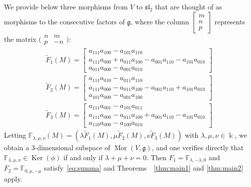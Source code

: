 \begin{ex}
We provide below three morphisms from $V$ to ${\mathfrak{sl}_2}$ that are thought of as morphisms to the consecutive 
factors of ${{\mathfrak g}}$, where the column $\left[\begin{smallmatrix} m \\ n \\ p\end{smallmatrix}\right]$ represents 
the matrix $\bigl(\begin{smallmatrix} n & m \\ p & -n \end{smallmatrix}\bigr)$:
\begin{gather*}   
  \tilde F_1(M)=
  \begin{bmatrix} a_{111}a_{100}-a_{101}a_{110} \\
  a_{111}a_{000}+a_{011}a_{100} -a_{001}a_{110}-a_{101}a_{010}\\
  a_{011}a_{000}-a_{001}a_{010} 
  \end{bmatrix}  \\
  \tilde F_2( M)=
  \begin{bmatrix} a_{111}a_{010}-a_{011}a_{110} \\
  a_{111}a_{000}-a_{011}a_{100} -a_{001}a_{110}+a_{101}a_{010}\\
  a_{101}a_{000}-a_{001}a_{100} 
  \end{bmatrix}  \\
  \tilde F_3(M)=
  \begin{bmatrix} a_{111}a_{001}-a_{101}a_{011} \\
  a_{111}a_{000}-a_{011}a_{100} +a_{001}a_{110}-a_{101}a_{010}\\
  a_{110}a_{000}-a_{100}a_{010} 
  \end{bmatrix}
\end{gather*}
Letting $\mathbb F_{{\lambda},\mu,\nu}(M){=}({\lambda} \tilde F_1(M), \mu \tilde F_2(M), \nu \tilde F_3(M))$ with 
${\lambda},\mu,\nu\in{\Bbbk}$, we 
obtain a 3-dimensional subspace of ${\operatorname{Mor}}(V,{{\mathfrak g}})$, and one verifies directly that 
$\mathbb F_{{\lambda},\mu,\nu}\in {\operatorname{Ker}}(\phi)$ if and only if ${\lambda}+\mu+\nu=0$.
Then $F_1=\mathbb F_{{\lambda},-{\lambda},0}$ and $F_2=\mathbb F_{0,\mu,-\mu}$ satisfy~\eqref{eq:summa} and 
Theorems~~\ref{thm:main1} and \ref{thm:main2} apply. 
\\ 
\end{ex}     

